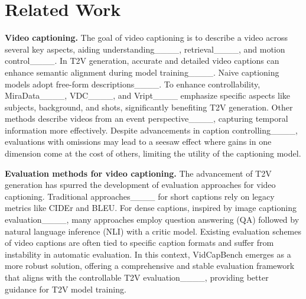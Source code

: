 \section{Related Work}
\noindent\textbf{Video captioning.}
The goal of video captioning is to describe a video across several key aspects, aiding understanding____, retrieval____, and motion control____.
In T2V generation, accurate and detailed video captions can enhance semantic alignment during model training____.
Naive captioning models adopt free-form descriptions____.
To enhance controllability, MiraData____, VDC____, and Vript____ emphasize specific aspects like subjects, background, and shots, significantly benefiting T2V generation.
Other methods describe videos from an event perspective____, capturing temporal information more effectively.
Despite advancements in caption controlling____, 
evaluations with omissions may lead to a seesaw effect where gains in one dimension come at the cost of others, limiting the utility of the captioning model.

\noindent\textbf{Evaluation methods for video captioning.}
The advancement of T2V generation has spurred the development of evaluation approaches for video captioning.
Traditional approaches____ for short captions rely on legacy metrics like CIDEr and BLEU.
For dense captions, inspired by image captioning evaluation____, many approaches employ question answering (QA) followed by natural language inference (NLI) with a critic model.
Existing evaluation schemes of video captions are often tied to specific caption formats and suffer from instability in automatic evaluation.
In this context, VidCapBench emerges as a more robust solution, offering a comprehensive and stable evaluation framework that aligns with the controllable T2V evaluation____, providing better guidance for T2V model training.